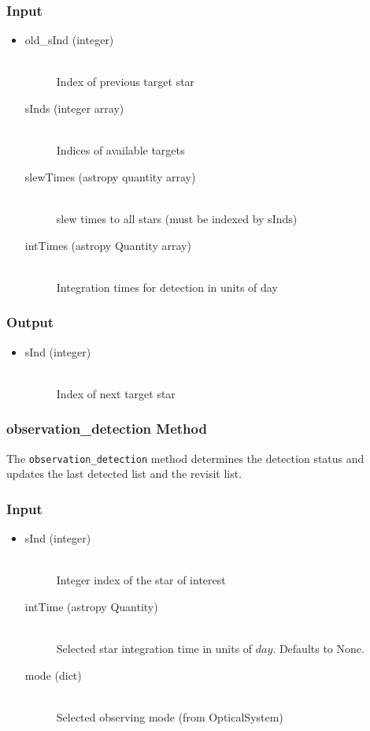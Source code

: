 \documentclass[cleanfoot]{asme2ej}
\begin{document}
\subsubsection*{Input}
\begin{itemize}
\item
\begin{description}
    \item[old\_sInd (integer)] \hfill \\ Index of previous target star
    \item[sInds (integer array)] \hfill \\ Indices of available targets
    \item[slewTimes (astropy quantity array)] \hfill \\ slew times to all stars (must be indexed by sInds)
    \item[intTimes (astropy Quantity array)] \hfill \\ Integration times for detection in units of day
\end{description}
\end{itemize}
\subsubsection*{Output}
\begin{itemize}
\item 
\begin{description}
    \item[sInd (integer)] \hfill \\ Index of next target star
\end{description}
\end{itemize}

\subsubsection{observation\_detection Method} \label{sec:observationdetectiontask}
The \verb+observation_detection+ method determines the detection status and updates the last detected list and the revisit list. 
\subsubsection*{Input}
\begin{itemize}
\item
\begin{description}
    \item[sInd (integer)] \hfill \\ Integer index of the star of interest
    \item[intTime (astropy Quantity)] \hfill \\ Selected star integration time in units of $day$. Defaults to None.
    \item[mode (dict)] \hfill \\ Selected observing mode (from OpticalSystem)
\end{description}
\end{itemize}
\end{document}

